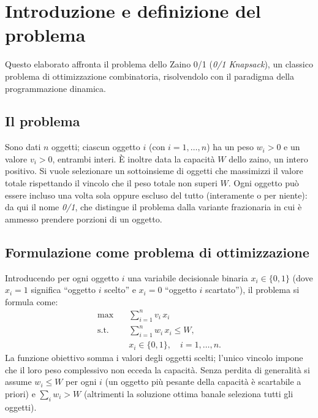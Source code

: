 \documentclass[11pt]{article}
\begin{document}
\section{Introduzione e definizione del problema}

Questo elaborato affronta il problema dello Zaino 0/1 (\emph{0/1 Knapsack}), un
classico problema di ottimizzazione combinatoria, risolvendolo con il paradigma
della programmazione dinamica.

\subsection{Il problema}
Sono dati $n$ oggetti; ciascun oggetto $i$ (con $i = 1,\dots,n$) ha un peso
$w_i > 0$ e un valore $v_i > 0$, entrambi interi. \`E inoltre data la capacit\`a
$W$ dello zaino, un intero positivo. Si vuole selezionare un sottoinsieme di
oggetti che massimizzi il valore totale rispettando il vincolo che il peso totale
non superi $W$. Ogni oggetto pu\`o essere incluso una volta sola oppure escluso
del tutto (interamente o per niente): da qui il nome \emph{0/1}, che distingue il
problema dalla variante frazionaria in cui \`e ammesso prendere porzioni di un
oggetto.

\subsection{Formulazione come problema di ottimizzazione}
Introducendo per ogni oggetto $i$ una variabile decisionale binaria
$x_i \in \{0,1\}$ (dove $x_i = 1$ significa ``oggetto $i$ scelto'' e $x_i = 0$
``oggetto $i$ scartato''), il problema si formula come:
\[
\begin{aligned}
\max\quad         & \sum_{i=1}^{n} v_i\, x_i \\[2pt]
\text{s.t.}\quad  & \sum_{i=1}^{n} w_i\, x_i \le W, \\[2pt]
                         & x_i \in \{0,1\}, \quad i = 1,\dots,n.
\end{aligned}
\]
La funzione obiettivo somma i valori degli oggetti scelti; l'unico vincolo impone
che il loro peso complessivo non ecceda la capacit\`a. Senza perdita di
generalit\`a si assume $w_i \le W$ per ogni $i$ (un oggetto pi\`u pesante della
capacit\`a \`e scartabile a priori) e $\sum_{i} w_i > W$ (altrimenti la soluzione
ottima banale seleziona tutti gli oggetti).
\end{document}
